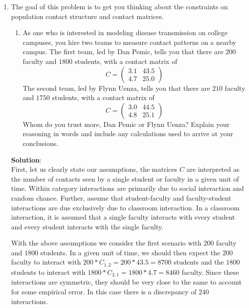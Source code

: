 \documentclass[11pt]{article}
\begin{document}
\begin{enumerate}
	\item The goal of this problem is to get you thinking about the constraints on population contact structure and contact matrices.
	
\begin{enumerate}[label=\alph*.]
	\item As one who is interested in modeling disease transmission on college campuses, you hire two teams to measure contact patterns on a nearby campus. The first team, led by Dan Pemic, tells you that there are $200$ faculty and $1800$ students, with a contact matrix of 
	$$C = \begin{pmatrix}
		3.1 & 43.5 \\
		4.7 & 25.0
	\end{pmatrix}$$
The second team, led by Flynn Uenza, tells you that there are $210$ faculty and $1750$ students, with a contact matrix of
	$$C = \begin{pmatrix}
		3.0 & 44.5 \\
		4.8 & 25.1
		\end{pmatrix}
	$$
Whom do you trust more, Dan Pemic or Flynn Uenza? Explain your reasoning in words and include any calculations used to arrive at your conclusions. 
\end{enumerate}

\begin{tcolorbox}
	\textbf{Solution}:\\
	First, let us clearly state our assumptions, the matrices $C$ are interpreted as the number of contacts seen by a single student or faculty in a given unit of time. Within category interactions are primarily due to social interaction and random chance. Further, assume that student-faculty and faculty-student interactions are due exclusively due to classroom interaction. In a classroom interaction, it is assumed that a single faculty interacts with every student and every student interacts with the single faculty. 
	
	With the above assumptions we consider the first scenario with $200$ faculty and $1800$ students. In a given unit of time, we should then expect the $200$ faculty to interact with $200*C_{1,2}=200*43.5=8700$ students and the $1800$ students to interact with $1800*C_{2, 1}=1800*4.7=8460$ faculty. Since these interactions are symmetric, they should be very close to the same to account for some empirical error. In this case there is a discrepancy of $240$ interactions.
	

\end{tcolorbox}
\end{enumerate}
\end{document}
